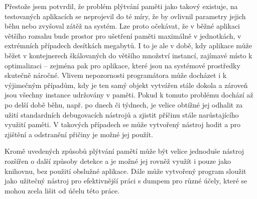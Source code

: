 Přestože jsem potvrdil, že problém plýtvání paměti jako takový existuje, na testovaných aplikacích se neprojevil do té míry, že by ovlivnil parametry jejich běhu nebo zvyšoval zátěž na systém. Lze proto očekávat, že v běžné aplikaci většího rozsahu bude prostor pro ušetření paměti maximálně v jednotkách, v extrémních případech desítkách megabytů. I to je ale v době, kdy aplikace může běžet v kontejnerech škálovaných do většího množství instancí, zajímavé místo k optimalizaci -- zejména pak pro aplikace, které jsou na systémové prostředky skutečně náročné. Vlivem nepozornosti programátora může docházet i k výjimečným případům, kdy je ten samý objekt vytvářen stále dokola a zároveň jsou všechny instance udržovány v paměti. Pokud k tomuto problému dochází až po delší době běhu, např. po dnech či týdnech, je velice obtížné jej odhalit za užití standardních debugovacích nástrojů a zjistit příčinu stále narůstajícího využití paměti. V takových případech se může vytvořený nástroj hodit a pro zjištění a odstranění přičiny je možné jej použít.

Kromě uvedených způsobů plýtvání pamětí může být velice jednoduše nástroj rozšířen o další způsoby detekce a je možné jej rovněž využít i pouze jako knihovnu, bez použití obslužné aplikace. Dále může vytvořený program sloužit jako užitečný nástroj pro efektivnější práci s dumpem pro různé účely, které se mohou zcela lišit od účelu této práce. 